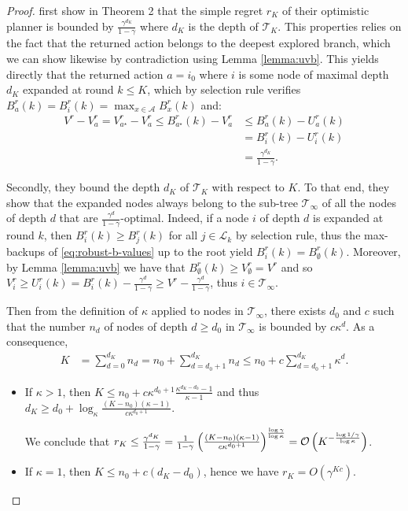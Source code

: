 \documentclass{article}
\begin{document}
\begin{proof}
	\citet{Hren2008} first show in Theorem 2 that the simple regret $r_K$ of their optimistic planner is bounded by $\frac{\gamma^{d_K}}{1 - \gamma}$ where $d_K$ is the depth of $\mathcal{T}_K$. This properties relies on the fact that the returned action belongs to the deepest explored branch, which we can show likewise by contradiction using Lemma \ref{lemma:uvb}. This yields directly that the returned action $a = i_0$ where $i$ is some node of maximal depth $d_K$ expanded at round $k\leq K$, which by selection rule verifies $B_a^r(k) = B_i^r(k) = \max_{x\in\mathcal{A}} B_x^r(k)$ and:
	\begin{align*}
	\label{eq:Rndn}
	V^r - V_a^r = V_{a^{\star}}^r - V_a^r  \leq B_{a^{\star}}^r(k) - V_a^r &\leq B_{a}^r(k) - U_a^r(k) \\
	&= B_{i}^r(k) - U_i^r(k) \\
	&= \frac{\gamma^{d_K}}{1-\gamma}.
	\end{align*}
	
	Secondly, they bound the depth $d_K$ of $\mathcal{T}_K$ with respect to $K$. To that end, they show that the expanded nodes always belong to the sub-tree $\mathcal{T}_\infty$ of all the nodes of depth $d$ that are $\frac{\gamma^d}{1-\gamma}$-optimal. Indeed, if a node $i$ of depth $d$ is expanded at round $k$, then $B_i^r(k) \geq B_j^r(k)$ for all $j\in \mathcal{L}_k$ by selection rule, thus the max-backups of \eqref{eq:robust-b-values} up to the root yield $B^r_i(k) = B_\emptyset^r(k)$. Moreover, by Lemma \ref{lemma:uvb} we have that $B_\emptyset^r(k) \geq V_\emptyset^r = V^r$ and so $V_i^r \geq U_i^r(k) = B_i^r(k) - \frac{\gamma^d}{1-\gamma} \geq V^r - \frac{\gamma^d}{1-\gamma}$, thus $i \in \mathcal{T}_\infty$.
	
	Then from the definition of $\kappa$ applied to nodes in $\mathcal{T}_\infty$, there exists $d_0$ and $c$ such that the number $n_d$ of nodes of depth $d \geq d_0$ in $\mathcal{T}_\infty$ is bounded by $c\kappa^d$. As a consequence, 
	\begin{eqnarray*}
		K &= \sum_{d=0}^{d_K} n_d = n_0 + \sum_{d=d_0+1}^{d_K} n_d \leq n_0 + c\sum_{d={d_0+1}}^{d_K} \kappa^d.
	\end{eqnarray*}
	
	\begin{itemize}
		\item If $\kappa > 1$, then $K \leq n_0 + c\kappa^{d_0+1}\frac{\kappa^{d_K-d_0}-1}{\kappa-1}$ and thus $d_K \geq d_0 + \log_\kappa \frac{(K-n_0)(\kappa - 1)}{c\kappa^{d_0+1}}$.
		
		We conclude that $r_K \leq \frac{\gamma^{d_K}}{1-\gamma} = \frac{1}{1-\gamma} \left( \frac{(K-n_0)(\kappa - 1)}{c\kappa^{d_0+1}} \right)^\frac{\log \gamma}{\log \kappa} = \mathcal{O}\left(K^{-\frac{\log 1/\gamma}{\log \kappa}}\right)$.
		
		\item If $\kappa = 1$, then $K \leq n_0 + c(d_K-d_0)$, hence we have $r_K = O\left(\gamma^{Kc}\right)$.
	\end{itemize}
\end{proof}
\end{document}
